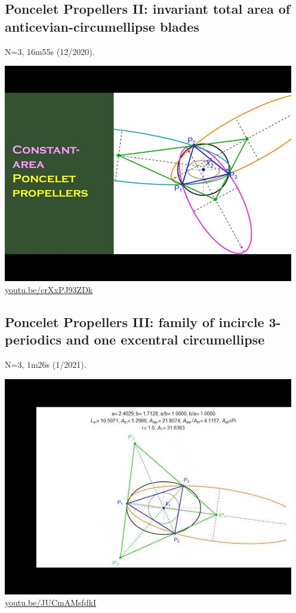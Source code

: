 \documentclass[12pt]{amsart}
\begin{document}
\subsection{Poncelet Propellers II: invariant total area of anticevian-circumellipse blades}
\label{vid:crXxPJ93ZDk}
\noindent N=3, 16m55s (12/2020). 
\begin{center}\includegraphics[width=.5\textwidth]{pics/crXxPJ93ZDk.jpg} \\ 
\href{https://youtu.be/crXxPJ93ZDk}{\url{youtu.be/crXxPJ93ZDk}}\end{center}
% 

\subsection{Poncelet Propellers III: family of incircle 3-periodics and one excentral circumellipse}
\label{vid:JUCmAMsfdkI}
\noindent N=3, 1m26s (1/2021). 
\begin{center}\includegraphics[width=.5\textwidth]{pics/JUCmAMsfdkI.jpg} \\ 
\href{https://youtu.be/JUCmAMsfdkI}{\url{youtu.be/JUCmAMsfdkI}}\end{center}
% 
\end{document}
